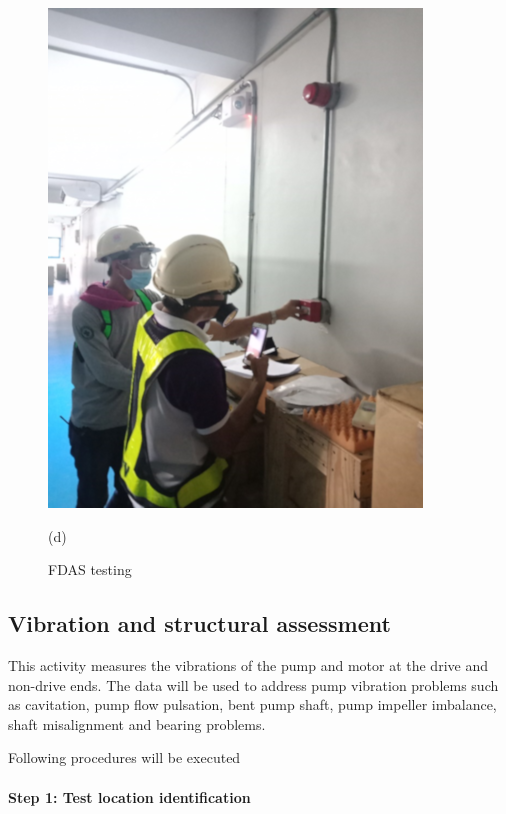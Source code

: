 \begin{figure}[h]
\begin{minipage}[b]{0.22\linewidth}
		\includegraphics[width=\textwidth]{figures/ch02_fdas04}
		\caption*{(d)}
	\end{minipage}
	\caption{FDAS testing}
	\label{ch02_fdas}
\end{figure}

\subsection{Vibration and structural assessment}
\label{235}
This activity measures the vibrations of the pump and motor at the drive and non-drive ends. The data will be used to address pump vibration problems such as cavitation, pump flow pulsation, bent pump shaft, pump impeller imbalance, shaft misalignment and bearing problems.

Following procedures will be executed

\paragraph{Step 1: Test location identification}

